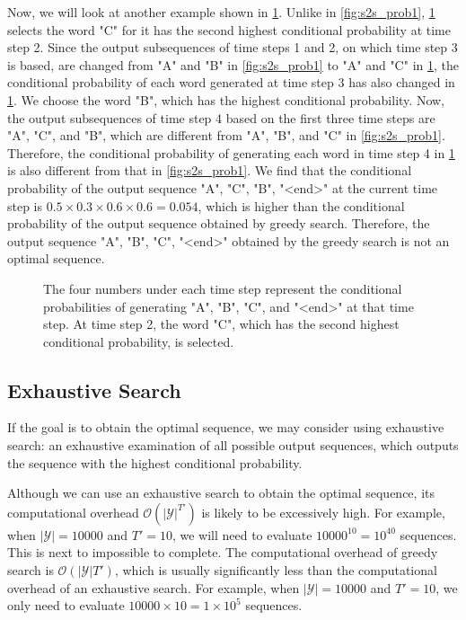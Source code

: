 Now, we will look at another example shown in \cref{fig:s2s_prob2}. Unlike in \cref{fig:s2s_prob1}, \cref{fig:s2s_prob2} selects the word "C" for it has the second highest conditional probability at time step 2. Since the output subsequences of time steps 1 and 2, on which time step 3 is based, are changed from "A" and "B" in \cref{fig:s2s_prob1} to "A" and "C" in \cref{fig:s2s_prob2}, the conditional probability of each word generated at time step 3 has also changed in \cref{fig:s2s_prob2}. We choose the word "B", which has the highest conditional probability. Now, the output subsequences of time step 4 based on the first three time steps are "A", "C", and "B", which are different from "A", "B", and "C" in \cref{fig:s2s_prob1}. Therefore, the conditional probability of generating each word in time step 4 in \cref{fig:s2s_prob2} is also different from that in \cref{fig:s2s_prob1}. We find that the conditional probability of the output sequence "A", "C", "B", "<end>" at the current time step is $0.5\times0.3 \times0.6\times0.6=0.054$, which is higher than the conditional probability of the output sequence obtained by greedy search. Therefore, the output sequence "A", "B", "C", "<end>" obtained by the greedy search is not an optimal sequence.

\begin{figure}[hpt]
	\centering
	
	\caption{The four numbers under each time step represent the conditional probabilities of generating "A", "B", "C", and "<end>" at that time step.  At time step 2, the word "C", which has the second highest conditional probability, is selected.}
	\label{fig:s2s_prob2}
\end{figure}

\subsection{Exhaustive Search}\label{subsec:exhaustive-search}

If the goal is to obtain the optimal sequence, we may consider using exhaustive search: an exhaustive examination of all possible output sequences, which outputs the sequence with the highest conditional probability.

Although we can use an exhaustive search to obtain the optimal sequence, its computational overhead $\mathcal{O}(\left|\mathcal{Y}\right|^{T'})$ is likely to be excessively high. For example, when $|\mathcal{Y}|=10000$ and $T'=10$, we will need to evaluate $10000^{10} = 10^{40}$ sequences. This is next to impossible to complete. The computational overhead of greedy search is $\mathcal{O}(\left|\mathcal{Y}\right|T')$, which is usually significantly less than the computational overhead of an exhaustive search. For example, when $|\mathcal{Y}|=10000$ and $T'=10$, we only need to evaluate $10000\times10=1\times10^5$ sequences.

